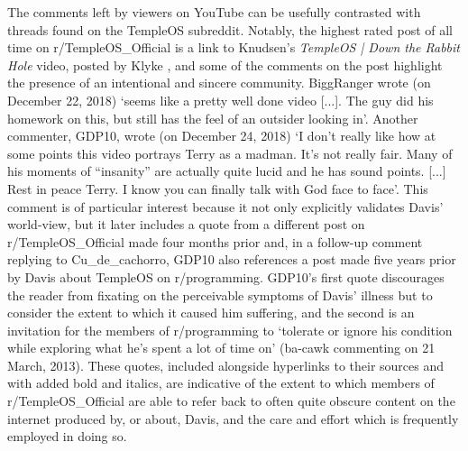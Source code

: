 \documentclass[Draft.tex]{subfiles}
\begin{document}
The comments left by viewers on YouTube can be usefully contrasted
with threads found on the TempleOS subreddit\footnotemark.
Notably, the highest rated post of all time on r/TempleOS\_Official
is a link to Knudsen's \textit{TempleOS | Down the Rabbit Hole} video,
posted by Klyke \parencite*{Klyke18},
and some of the comments on the post highlight the presence of
an intentional and sincere community.
BiggRanger wrote (on December 22, 2018)
`seems like a pretty well done video [...].  The guy did his homework on this,
but still has the feel of an outsider looking in'.
Another commenter, GDP10, wrote (on December 24, 2018)
`I don't really like how at some points this video portrays Terry as a madman.
It's not really fair.  Many of his moments of ``insanity''
are actually quite lucid and he has sound points. [...]
Rest in peace Terry.  I know you can finally talk with God face to face'.
This comment is of particular interest because it not only explicitly validates
Davis' world-view, but it later includes a quote from a different post on
r/TempleOS\_Official made four months prior and,
in a follow-up comment replying to Cu\_de\_cachorro, GDP10 also references
a post made five years prior by Davis \parencite*{Davis13}
about TempleOS on r/programming.
GDP10's first quote discourages the reader from fixating on the perceivable
symptoms of Davis' illness but to consider the extent to which it caused him
suffering, and the second is an invitation for the members of r/programming
to `tolerate or ignore his condition
while exploring what he's spent a lot of time on'
(ba-cawk commenting on 21 March, 2013).
These quotes, included alongside hyperlinks to their sources and with added bold and italics,
are indicative of the extent to which members of r/TempleOS\_Official
are able to refer back to often quite obscure content on the internet produced
by, or about, Davis, and the care and effort which is frequently employed
in doing so.

\end{document}

